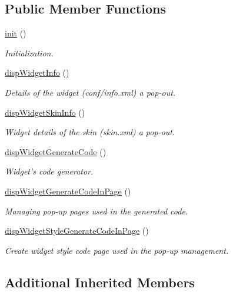 \subsection*{Public Member Functions}
\begin{DoxyCompactItemize}
\item 
\hyperlink{classwidgetView_aae33eb1e6769bef674ec184703a6bac2}{init} ()
\begin{DoxyCompactList}\small\item\em Initialization. \end{DoxyCompactList}\item 
\hyperlink{classwidgetView_aa0744579c05eacb742561abbc967c720}{disp\+Widget\+Info} ()
\begin{DoxyCompactList}\small\item\em Details of the widget (conf/info.\+xml) a pop-\/out. \end{DoxyCompactList}\item 
\hyperlink{classwidgetView_a7d7203cb8a9ddec4628beb6ae1f55ff5}{disp\+Widget\+Skin\+Info} ()
\begin{DoxyCompactList}\small\item\em Widget details of the skin (skin.\+xml) a pop-\/out. \end{DoxyCompactList}\item 
\hyperlink{classwidgetView_af0e573b3b57857bc0941237399e21b19}{disp\+Widget\+Generate\+Code} ()
\begin{DoxyCompactList}\small\item\em Widget's code generator. \end{DoxyCompactList}\item 
\hyperlink{classwidgetView_a0600670ca5dac17d9549bacecd90c3cf}{disp\+Widget\+Generate\+Code\+In\+Page} ()
\begin{DoxyCompactList}\small\item\em Managing pop-\/up pages used in the generated code. \end{DoxyCompactList}\item 
\hyperlink{classwidgetView_a0bc95329be4497bd1b8dbb7702b51e2c}{disp\+Widget\+Style\+Generate\+Code\+In\+Page} ()
\begin{DoxyCompactList}\small\item\em Create widget style code page used in the pop-\/up management. \end{DoxyCompactList}\end{DoxyCompactItemize}
\subsection*{Additional Inherited Members}


